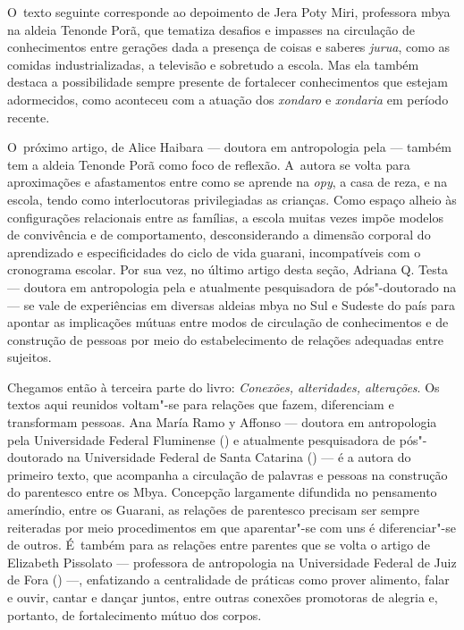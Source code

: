 O~texto seguinte corresponde ao depoimento de Jera Poty Miri, professora
mbya na aldeia Tenonde Porã, que tematiza desafios e impasses na
circulação de conhecimentos entre gerações dada a presença de coisas e
saberes \emph{jurua}, como as comidas industrializadas, a televisão e
sobretudo a escola. Mas ela também destaca a possibilidade sempre
presente de fortalecer conhecimentos que estejam adormecidos, como
aconteceu com a atuação dos \emph{xondaro} e \emph{xondaria} em período recente. 

O~próximo artigo, de Alice Haibara --- doutora em antropologia pela  ---
também tem a aldeia Tenonde Porã como foco de reflexão. A~autora se
volta para aproximações e afastamentos entre como se aprende na \emph{opy}, a
casa de reza, e na escola, tendo como interlocutoras privilegiadas as
crianças. Como espaço alheio às configurações relacionais entre as
famílias, a escola muitas vezes impõe modelos de convivência e de
comportamento, desconsiderando a dimensão corporal do aprendizado e
especificidades do ciclo de vida guarani, incompatíveis com o
cronograma escolar. Por sua vez, no último artigo desta seção, Adriana
Q. Testa --- doutora em antropologia pela  e atualmente pesquisadora
de pós"-doutorado na  --- se vale de experiências em diversas
aldeias mbya no Sul e Sudeste do país para apontar as implicações
mútuas entre modos de circulação de conhecimentos e de construção de
pessoas por meio do estabelecimento de relações adequadas entre
sujeitos. 

Chegamos então à terceira parte do livro: \emph{Conexões, alteridades,
alterações}. Os textos aqui reunidos voltam"-se para relações que fazem,
diferenciam e transformam pessoas. Ana María Ramo y Affonso --- doutora
em antropologia pela Universidade Federal Fluminense () e atualmente
pesquisadora de pós"-doutorado na Universidade Federal de Santa Catarina
() --- é a autora do primeiro texto, que acompanha a circulação de
palavras e pessoas na construção do parentesco entre os Mbya. Concepção
largamente difundida no pensamento ameríndio, entre os Guarani, as relações
de parentesco precisam ser sempre reiteradas por meio procedimentos em
que aparentar"-se com uns é diferenciar"-se de outros. É~também para as
relações entre parentes que se volta o artigo de Elizabeth Pissolato ---
professora de antropologia na Universidade Federal de Juiz de Fora
() ---, enfatizando a centralidade de práticas como prover alimento,
falar e ouvir, cantar e dançar juntos, entre outras conexões promotoras
de alegria e, portanto, de fortalecimento mútuo dos corpos.


